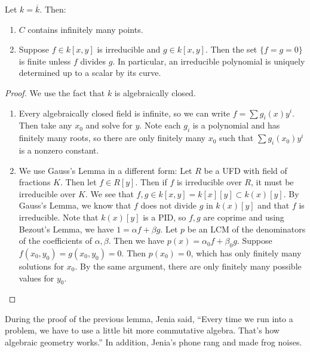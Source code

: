 \documentclass[twoside, 10pt]{article}
\begin{document}
    \begin{lem} Let $k= \overline{k}$. Then:

        \begin{enumerate} \item $C$ contains infinitely many points.  \item
            Suppose $f \in k[x,y]$ is irreducible and $g \in k[x,y]$.  Then the
            set $\{f=g=0\}$ is finite unless $f$ divides $g$. In particular, an
            irreducible polynomial is uniquely determined up to a scalar by its
    curve.  \end{enumerate}

        \begin{proof} We use the fact that $k$ is algebraically closed.
            \begin{enumerate} \item Every algebraically closed field is
                infinite, so we can write $f = \sum g_i(x)y^i$. Then take any
                $x_0$ and solve for $y$. Note each $g_i$ is a polynomial and
                has finitely many roots, so there are only finitely many $x_0$
                such that $\sum g_i(x_0)y^i$ is a nonzero constant.  \item We
                use Gauss's Lemma in a different form: Let $R$ be a UFD with
                field of fractions $K$. Then let $f \in R[y]$.  Then if $f$ is
                irreducible over $R$, it must be irreducible over $K$. We see
                that $f,g \in k[x,y] = k[x][y] \subset k(x)[y]$. By Gauss's
                Lemma, we know that $f$ does not divide $g$ in $k(x)[y]$ and
                that $f$ is irreducible. Note that $k(x)[y]$ is a PID, so $f,g$
                are coprime and using Bezout's Lemma, we have $1 = \alpha f +
                \beta g$. Let $p$ be an LCM of the denominators of the
                coefficients of $\alpha,\beta$. Then we have $p(x) = \alpha_0 f
                + \beta_0 g$. Suppose $f(x_0,y_0) = g(x_0,y_0) = 0$. Then
        $p(x_0) = 0$, which has only finitely many solutions for $x_0$. By the
same argument, there are only finitely many possible values for $y_0$.
\end{enumerate} \end{proof} \end{lem}

    During the proof of the previous lemma, Jenia said, ``Every time we run
    into a problem, we have to use a little bit more commutative algebra.
    That's how algebraic geometry works.'' In addition, Jenia's phone rang and
    made frog noises.
\end{document}
